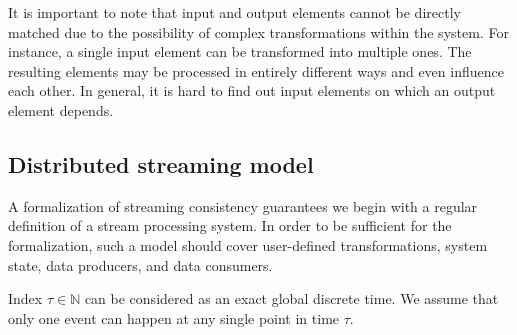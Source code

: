 It is important to note that input and output elements cannot be directly matched due to the possibility of complex transformations within the system. 
For instance, a single input element can be transformed into multiple ones.  The resulting elements may be processed in entirely different ways and even influence each other. 
In general, it is hard to find out input elements on which an output element depends. 

\subsection{Distributed streaming model}


A formalization of streaming consistency guarantees we begin with a regular definition of a stream processing system. In order to be sufficient for the formalization, such a model should cover user-defined transformations, system state, data producers, and data consumers.

Index $\tau\in{\mathbb{N}}$ can be considered as an exact global discrete time. We assume that only one event can happen at any single point in time $\tau$.

